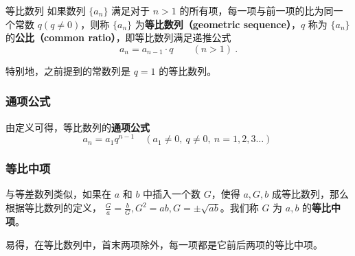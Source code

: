 


\begin{definition}{等比数列}
如果数列 $\{a_n\}$ 满足对于 $n > 1$ 的所有项，每一项与前一项的比为同一个常数 $q(q\neq0)$，则称 $\{a_n\}$ 为\textbf{等比数列（geometric sequence）}，$q$ 称为 $\{a_n\}$ 的\textbf{公比（common ratio）}，即等比数列满足递推公式
\begin{equation}
a_{n}=a_{n-1}\cdot q\qquad(n>1)~.
\end{equation}
\end{definition}

特别地，之前提到的常数列是 $q = 1$ 的等比数列。

\subsubsection{通项公式}
由定义可得，等比数列的\textbf{通项公式}
\begin{equation}
a_n = a_1 q^{n-1} \quad (a_1 \ne 0,\ q\ne 0,\ n=1,2,3\dots)~
\end{equation}

\subsubsection{等比中项}
与等差数列类似，如果在 $a$ 和 $b$ 中插入一个数 $G$，使得 $a,G,b$ 成等比数列，那么根据等比数列的定义， $\frac{G}{a} = \frac{b}{G},G^2 = ab,G = \pm \sqrt{ab}$。我们称 $G$ 为 $a,b$ 的\textbf{等比中项}。

易得，在等比数列中，首末两项除外，每一项都是它前后两项的等比中项。

